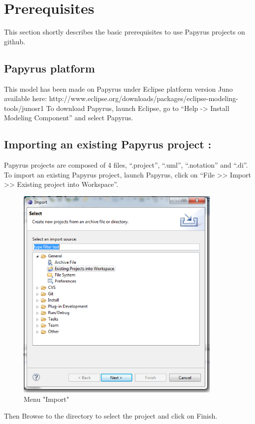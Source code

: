 \documentclass{template/openetcs_article}
\begin{document}
\section{Prerequisites}
This section shortly describes the basic prerequisites to use Papyrus projects on github.
\subsection{Papyrus platform}
This model has been made on Papyrus under Eclipse platform version Juno available here: http://www.eclipse.org/downloads/packages/eclipse-modeling-tools/junosr1
To download Papyrus, launch Eclipse, go to “Help -> Install Modeling Component” and select Papyrus.

\subsection{Importing an existing Papyrus project :}
Papyrus projects are composed of 4 files, “.project”, “.uml”, “.notation” and “.di”. To import an existing Papyrus project, launch Papyrus, click on “File >> Import >> Existing project into Workspace”.
\newpage

\begin{figure}[h!]
  \centering
  \includegraphics[width=10cm]{fig2_menu_import.png}
  \caption{Menu "Import"}
  \label{fig: Menu "Import"}
\end{figure}

Then Browse to the directory to select the project and click on Finish.
\end{document}
